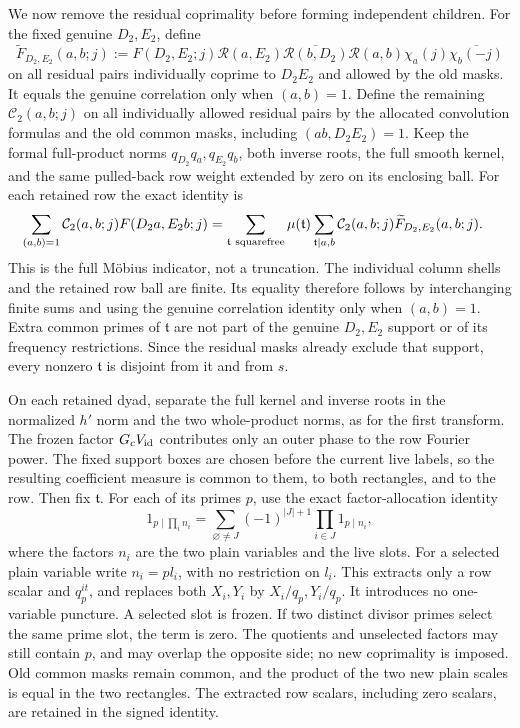 \documentclass[11pt,a4paper]{article}
\numberwithin{equation}{section}
\numberwithin{figure}{section}
\theoremstyle{definition}
\theoremstyle{remark}
\begin{document}
We now remove the residual coprimality before forming independent
children.  For the fixed genuine \(D_2,E_2\), define
\[
 \widetilde F_{D_2,E_2}(a,b;j)
 :=F(D_2,E_2;j)\mathcal R(a,E_2)
   \overline{\mathcal R(b,D_2)}\mathcal R(a,b)
   \chi_a(j)\overline{\chi_b(-j)}
\]
on all residual pairs individually coprime to \(D_2E_2\) and allowed by
the old masks.  It equals the genuine correlation only when \((a,b)=1\).
Define the remaining
\(\mathcal C_2(a,b;j)\) on all individually allowed residual pairs
by the allocated convolution formulas and the old common masks,
including \((ab,D_2E_2)=1\).  Keep the formal full-product norms
\(q_{D_2}q_a,q_{E_2}q_b\), both inverse roots, the full smooth
kernel, and the same pulled-back row weight extended by zero on its
enclosing ball.  For each retained row the exact identity is
\[
 \begin{split}
 \sum_{(a,b)=1}\mathcal C_2(a,b;j)F(D_2a,E_2b;j)
 &=\sum_{\mathfrak t\ {\rm squarefree}}\mu(\mathfrak t)
   \sum_{\mathfrak t\mid a,b}\mathcal C_2(a,b;j)
                \widetilde F_{D_2,E_2}(a,b;j).
 \end{split}
\]
This is the full M\"obius indicator, not a truncation.  The individual
column shells and the retained row ball are finite.  Its equality
therefore follows by interchanging finite sums and using the genuine
correlation identity only when \((a,b)=1\).  Extra common primes of
\(\mathfrak t\) are not part of the genuine \(D_2,E_2\) support or
of its frequency restrictions.  Since the residual masks already
exclude that support, every nonzero \(\mathfrak t\) is disjoint from
it and from \(s\).

On each retained dyad, separate the full kernel and inverse roots in
the normalized \(h'\) norm and the two whole-product norms, as for the first transform.
The frozen factor \(G_cV_{\rm id}\) contributes only an outer phase
to the row Fourier power.  The fixed support boxes are chosen before
the current live labels, so the resulting coefficient measure is
common to them, to both rectangles, and to the row.  Then fix \(\mathfrak t\).  For each of its primes \(p\),
use the exact factor-allocation identity
\[
 1_{p\mid\prod_i n_i}
 =\sum_{\varnothing\ne J}(-1)^{|J|+1}
       \prod_{i\in J}1_{p\mid n_i},
\]
where the factors \(n_i\) are the two plain variables and the live
slots.  For a selected plain variable write \(n_i=pl_i\), with no
restriction on \(l_i\).  This extracts only a row scalar and
\(q_p^{it}\), and replaces both \(X_i,Y_i\) by
\(X_i/q_p,Y_i/q_p\).  It introduces no one-variable puncture.
A selected slot is frozen.  If two distinct divisor primes select
the same prime slot, the term is zero.  The quotients and unselected
factors may still contain \(p\), and may overlap the opposite side;
no new coprimality is imposed.  Old common masks remain common, and
the product of the two new plain scales is equal in the two rectangles.
The extracted row scalars, including zero scalars, are retained in
the signed identity.
\end{document}
